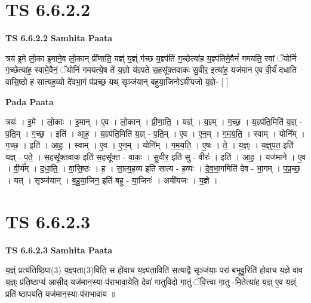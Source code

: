 \documentclass[17pt]{extarticle}
\begin{document}

\section{ TS 6.6.2.2 }

\textbf{TS 6.6.2.2 } \newline
\textbf{Samhita Paata} \newline

त्रय॑ इ॒मे लो॒का इ॒माने॒व लो॒कान् प्री॑णाति॒ यज्ञ्॑ य॒ज्ञ्ं ग॑च्छ य॒ज्ञ्प॑तिं ग॒च्छेत्या॑ह य॒ज्ञ्प॑तिमे॒वैनं॑ गमयति॒ स्वां ॅयोनिं॑ ग॒च्छेत्या॑ह॒ स्वामे॒वैनं॒ ॅयोनिं॑ गमयत्ये॒ष ते॑ य॒ज्ञो य॑ज्ञ्पते स॒हसू᳚क्तवाकः सु॒वीर॒ इत्या॑ह॒ यज॑मान ए॒व वी॒र्यं॑ दधाति वासि॒ष्ठो ह॑ सात्यह॒व्यो दे॑वभा॒गं प॑प्रच्छ॒ यथ् सृञ्ज॑यान् बहुया॒जिनोऽयी॑यजो य॒ज्ञे- [  ] \newline

\textbf{Pada Paata} \newline

त्रयः॑ । इ॒मे । लो॒काः । इ॒मान् । ए॒व । लो॒कान् । प्री॒णा॒ति॒ । यज्ञ्॑ । य॒ज्ञ्म् । ग॒च्छ॒ । य॒ज्ञ्प॑ति॒मिति॑ य॒ज्ञ् - प॒ति॒म् । ग॒च्छ॒ । इति॑ । आ॒ह॒ । य॒ज्ञ्प॑ति॒मिति॑ य॒ज्ञ् - प॒ति॒म् । ए॒व । ए॒न॒म् । ग॒म॒य॒ति॒ । स्वाम् । योनि᳚म् । ग॒च्छ॒ । इति॑ । आ॒ह॒ । स्वाम् । ए॒व । ए॒न॒म् । योनि᳚म् । ग॒म॒य॒ति॒ । ए॒षः । ते॒ । य॒ज्ञ्ः । य॒ज्ञ्॒प॒त॒ इति॑ यज्ञ् - प॒ते॒ । स॒हसू᳚क्तवाक॒ इति॑ स॒हसू᳚क्त - वा॒कः॒ । सु॒वीर॒ इति॑ सु - वीरः॑ । इति॑ । आ॒ह॒ । यज॑माने । ए॒व । वी॒र्य᳚म् । द॒धा॒ति॒ । वा॒सि॒ष्ठः । ह॒ । सा॒त्य॒ह॒व्य इति॑ सात्य - ह॒व्यः । दे॒व॒भा॒गमिति॑ देव - भा॒गम् । प॒प्र॒च्छ॒ । यत् । सृञ्ज॑यान् । ब॒हु॒या॒जिन॒ इति॑ बहु - या॒जिनः॑ । अयी॑यजः । य॒ज्ञे ।  \newline





\section{ TS 6.6.2.3 }

\textbf{TS 6.6.2.3 } \newline
\textbf{Samhita Paata} \newline

य॒ज्ञ्ं प्रत्य॑तिष्ठि॒पा(3) य॒ज्ञ्प॒ता(3)विति॒ स हो॑वाच य॒ज्ञ्प॑ता॒विति॑ स॒त्याद्वै सृञ्ज॑याः॒ परा॑ बभूवु॒रिति॑ होवाच य॒ज्ञे वाव य॒ज्ञ्ः प्र॑ति॒ष्ठाप्य॑ आसी॒द्-यज॑मान॒स्या-प॑राभावा॒येति॒ देवा॑ गातुविदो गा॒तुं ॅवि॒त्त्वा गा॒तु -मि॒तेत्या॑ह य॒ज्ञ् ए॒व य॒ज्ञ्ं प्रति॑ ष्ठापयति॒ यज॑मान॒स्या-प॑राभावाय ॥ \newline
\end{document}
